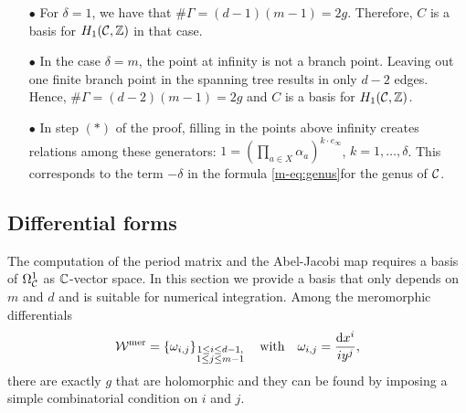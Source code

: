 \documentclass[main.tex]{subfiles}
\begin{document}
  \begin{rmk}
  \begin{itemize}
   \item[$\bullet$] For $\delta = 1$, we have that $\# \Gamma = (d-1)(m-1) = 2g$. Therefore, $C$ is a basis for $H_1(\mathcal{C},\mathbb{Z})$ in that case.
   \item[$\bullet$] In the case $\delta = m$, the point at infinity is not a branch point. Leaving out one finite branch point in the spanning tree results in only $d-2$ edges. Hence,
   $\# \Gamma = (d-2)(m-1) = 2g$ and $C$ is a basis for $H_1(\mathcal{C},\mathbb{Z})$.
   \item[$\bullet$] In step $(*)$ of the proof, filling in the points above infinity creates relations among
  these generators:
  $1 = (\prod_{a \in X} \alpha_a)^{k \cdot e_{\infty}}$, $k = 1,\dots,\delta$. This corresponds to the term $-\delta$ in the formula \eqref{m-eq:genus}for the genus of $\mathcal{C}$. 
  \end{itemize}
  \end{rmk}



\subsection{Differential forms}\label{subsec:diff_forms}

    The computation of the period matrix and the Abel-Jacobi map requires a basis of $\Omega^1_{\mathcal{C}}$ as $\mathbb{C}$-vector space. In this section we provide a basis that only
   depends on $m$ and $d$ and is suitable for numerical integration. \abstand
    Among the meromorphic differentials
    \begin{align*}
 \mathcal{W}^{\text{mer}} = \left\{  \omega_{i,j}   \right\}_{\substack{1 \le i \le d-1, \\ 1 \le j \le m-1}} \quad \text{with} \quad \omega_{i,j} = \frac{ \mathrm d x^i}{i y^j},
  \end{align*}
  there are exactly $g$ that are holomorphic  and they can be found by imposing a simple combinatorial condition on $i$ and $j$.


   \bigskip
\end{document}

